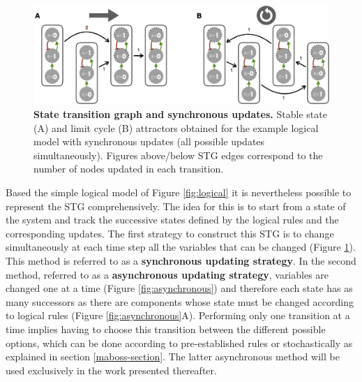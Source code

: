 \documentclass[a4paper,12pt,twoside,onecolumn,openright,final,oldfontcommands]{memoir}
\begin{document}
\begin{figure}

{\centering \includegraphics[width=0.9\linewidth]{fig/synchronous} 

}

\caption[State transition graph and synchronous updates]{\textbf{State transition graph and synchronous
updates.} Stable state (A) and limit cycle (B) attractors obtained for
the example logical model with synchronous updates (all possible updates
simultaneously). Figures above/below STG edges correspond to the number
of nodes updated in each transition.}\label{fig:synchronous}
\end{figure}







Based the simple logical model of Figure \ref{fig:logical} it is
nevertheless possible to represent the STG comprehensively. The idea for
this is to start from a state of the system and track the successive
states defined by the logical rules and the corresponding updates. The
first strategy to construct this STG is to change simultaneously at each
time step all the variables that can be changed (Figure
\ref{fig:synchronous}). This method is referred to as a
\textbf{synchronous updating strategy}. In the second method, referred
to as a \textbf{asynchronous updating strategy}, variables are changed
one at a time (Figure \ref{fig:asynchronous}) and therefore each state
has as many successors as there are components whose state must be
changed according to logical rules (Figure \ref{fig:asynchronous}A).
Performing only one transition at a time implies having to choose this
transition between the different possible options, which can be done
according to pre-established rules or stochastically as explained in
section \ref{maboss-section}. The latter asynchronous method will be
used exclusively in the work presented thereafter.
\end{document}
